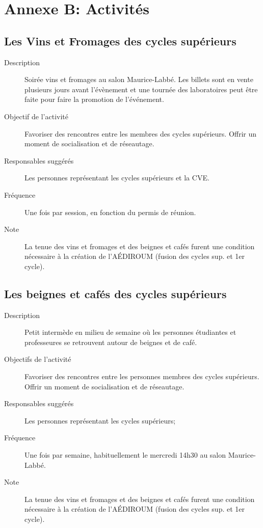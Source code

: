 \documentclass{aediroum}
\begin{document}
\section{Annexe B: Activités}
\subsection{Les Vins et Fromages des cycles supérieurs}
\begin{description}
	\item[Description] Soirée vins et fromages au salon Maurice-Labbé. Les billets sont en vente plusieurs jours avant l'évènement et une tournée des laboratoires peut être faite pour faire la promotion de l'événement.
	\item[Objectif de l'activité] Favoriser des rencontres entre les membres des cycles supérieurs. Offrir un moment de socialisation et de réseautage.
	\item[Responsables suggérés] Les personnes représentant les cycles supérieurs et la CVE.
	\item[Fréquence] Une fois par session, en fonction du permis de réunion.
	\item[Note] La tenue des vins et fromages et des beignes et cafés furent une condition nécessaire à la création de l'AÉDIROUM (fusion des cycles sup. et 1er cycle).
\end{description}

\subsection{Les beignes et cafés des cycles supérieurs}
\begin{description}
	\item[Description] Petit intermède en milieu de semaine où les personnes étudiantes et professeures se retrouvent autour de beignes et de café.
	\item[Objectifs de l'activité] Favoriser des rencontres entre les personnes membres des cycles supérieurs. Offrir un moment de socialisation et de réseautage.
	\item[Responsables suggérés] Les personnes représentant les cycles supérieurs;
	\item[Fréquence] Une fois par semaine, habituellement le mercredi 14h30 au salon Maurice-Labbé.
	\item[Note] La tenue des vins et fromages et des beignes et cafés furent une condition nécessaire à la création de l'AÉDIROUM (fusion des cycles sup. et 1er cycle).
\end{description}
\end{document}
